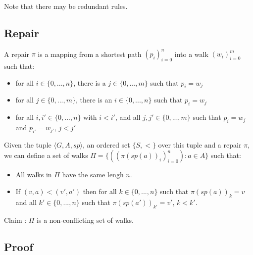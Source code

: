 Note that there may be redundant rules.

\subsection{Repair}

A repair $\pi$ is a mapping from a shortest path \((p_i)_{i=0}^{n}\) into a walk \((w_i)_{i=0}^{m}\) such that:
\begin{itemize}
  \item for all $i \in \{0,...,n\}$, there is a $j \in \{0,...,m\}$ such that $p_i=w_j$
  \item for all $j \in \{0,...,m\}$, there is an $i \in \{0,...,n\}$ such that $p_i=w_j$
  \item for all $i,i' \in \{0,...,n\}$ with $i<i'$, and all $j,j' \in \{0,...,m\}$
  such that $p_i=w_j$ and $p_{i'}=w_{j'}$, $j<j'$
\end{itemize}

Given the tuple $\langle G,A,sp \rangle$, an ordered set $\{S,<\}$ over this tuple and a repair $\pi$,
we can define a set of walks $\Pi = \{((\pi(sp(a))_i)_{i=0}^{n}) : a\in A\}$ such that:
\begin{itemize}
  \item All walks in $\Pi$ have the same lengh $n$.
  \item If $(v,a)<(v',a')$ then for all $k\in \{0,...,n\}$ such that $\pi(sp(a))_k=v$
  and all $k'\in \{0,...,n\}$ such that $\pi(sp(a'))_{k'}=v'$, $ k<k'$.
\end{itemize}

Claim : $\Pi$ is a non-conflicting set of walks.

\subsection{Proof}

